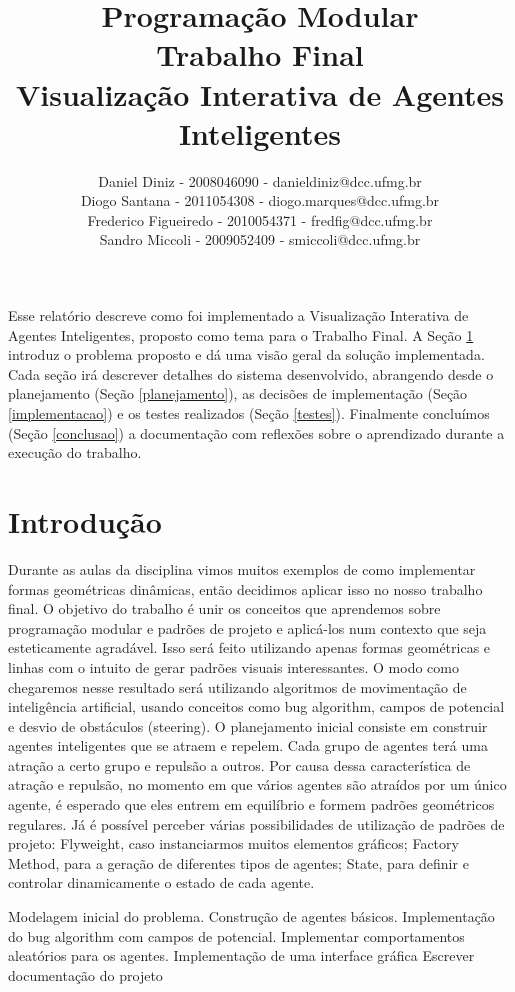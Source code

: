 \documentclass[12pt]{article}
\title{Programação Modular \\ Trabalho Final \\ Visualização Interativa de Agentes Inteligentes}
\author{Daniel Diniz - 2008046090 - danieldiniz@dcc.ufmg.br\\
		Diogo Santana - 2011054308 - diogo.marques@dcc.ufmg.br\\
		Frederico Figueiredo - 2010054371 - fredfig@dcc.ufmg.br\\
		Sandro Miccoli - 2009052409 - smiccoli@dcc.ufmg.br}
\begin{document}
\maketitle


\begin{resumo}

Esse relatório descreve como foi implementado a Visualização Interativa de Agentes Inteligentes, proposto como tema para o Trabalho Final. A Seção \ref{introducao} introduz o problema proposto e dá uma visão geral da solução implementada. Cada seção irá descrever detalhes do sistema desenvolvido, abrangendo desde o planejamento (Seção \ref{planejamento}), as decisões de implementação (Seção \ref{implementacao}) e os testes realizados (Seção \ref{testes}). Finalmente concluímos (Seção \ref{conclusao}) a documentação com reflexões sobre o aprendizado durante a execução do trabalho.

\end{resumo}

\section{Introdução}
\label{introducao}

Durante as aulas da disciplina vimos muitos exemplos de como implementar formas geométricas dinâmicas, então decidimos aplicar isso no nosso trabalho final. O objetivo do trabalho é unir os conceitos que aprendemos sobre programação modular e padrões de projeto e aplicá-los num contexto que seja esteticamente agradável. Isso será feito utilizando apenas formas geométricas e linhas com o intuito de gerar padrões visuais interessantes.
O modo como chegaremos nesse resultado será utilizando algoritmos de movimentação de inteligência artificial, usando conceitos como bug algorithm, campos de potencial e desvio de obstáculos (steering).
O planejamento inicial consiste em construir agentes inteligentes que se atraem e repelem. Cada grupo de agentes terá uma atração a certo grupo e repulsão a outros. Por causa dessa característica de atração e repulsão, no momento em que vários agentes são atraídos por um único agente, é esperado que eles entrem em equilíbrio e formem padrões geométricos regulares.
Já é possível perceber várias possibilidades de utilização de padrões de projeto:  Flyweight, caso instanciarmos muitos elementos gráficos; Factory Method, para a geração de diferentes tipos de agentes; State, para definir e controlar dinamicamente o estado de cada agente.

Modelagem inicial do problema.
Construção de agentes básicos.
Implementação do bug algorithm com campos de potencial.
Implementar comportamentos aleatórios para os agentes.
Implementação de uma interface gráfica
Escrever documentação do projeto
\end{document}
